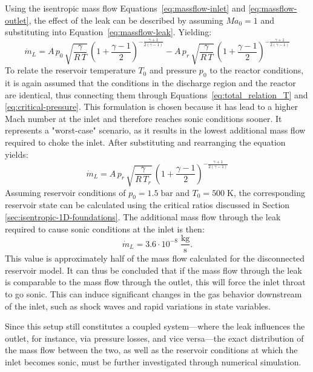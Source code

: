 	Using the isentropic mass flow Equations~\eqref{eq:massflow-inlet} and \eqref{eq:massflow-outlet}, the effect of the leak can be described by assuming $Ma_0 = 1$ and substituting into Equation~\eqref{eq:massflow-leak}.
	Yielding:
	$$
	    \dot{m}_L =
	    A\, p_0\, \sqrt{\frac{\gamma}{R\,T}}\, \left(1+\frac{\gamma-1}{2}\right)^{-\frac{\gamma+1}{2(\gamma-1)}}
	    - A\, p_r\, \sqrt{\frac{\gamma}{R\,T}}\, \left(1+\frac{\gamma-1}{2}\right)^{-\frac{\gamma+1}{2(\gamma-1)}}
	$$
	To relate the reservoir temperature $T_0$ and pressure $p_0$ to the reactor conditions, it is again assumed that the conditions in the discharge region and the reactor are identical, thus connecting them through Equations~\eqref{eq:total_relation_T} and \eqref{eq:critical-pressure}.
	This formulation is chosen because it has lead to a higher Mach number at the inlet and therefore reaches sonic conditions sooner.
	It represents a "worst-case" scenario, as it results in the lowest additional mass flow required to choke the inlet.
	After substituting and rearranging the equation yields:
	\begin{equation}
	    \dot{m}_L =
	    A\, p_r\, \sqrt{\frac{\gamma}{R\, T_r}}\,
	    \left(1 + \frac{\gamma - 1}{2}\right)^{-\frac{\gamma + 1}{2(\gamma - 1)}}
	\end{equation}
	Assuming reservoir conditions of $p_0 = 1.5\;\text{bar}$ and $T_0 = 500\;\text{K}$, the corresponding reservoir state can be calculated using the critical ratios discussed in Section \ref{sec:isentropic-1D-foundations}.
	The additional mass flow through the leak required to cause sonic conditions at the inlet is then:
	$$
	    \dot{m}_L = 3.6 \cdot 10^{-8} \; \frac{\text{kg}}{\text{s}}.
	$$
	This value is approximately half of the mass flow calculated for the disconnected reservoir model.
	It can thus be concluded that if the mass flow through the leak is comparable to the mass flow through the outlet, this will force the inlet throat to go sonic.
	This can induce significant changes in the gas behavior downstream of the inlet, such as shock waves and rapid variations in state variables.

	Since this setup still constitutes a coupled system—where the leak influences the outlet, for instance, via pressure losses, and vice versa—the exact distribution of the mass flow between the two, as well as the reservoir conditions at which the inlet becomes sonic, must be further investigated through numerical simulation.
